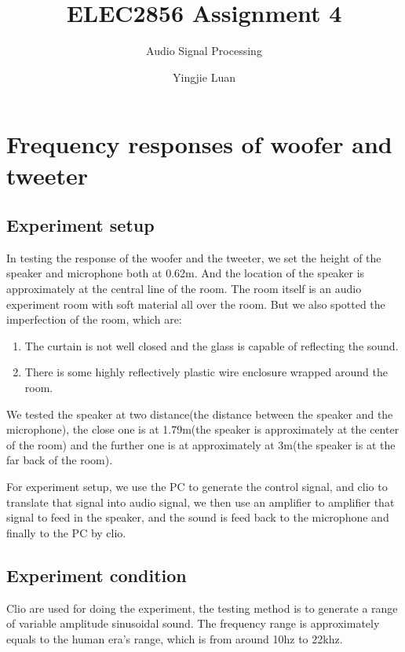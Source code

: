 \documentclass[11pt]{scrartcl}
\begin{document}
\title{ELEC2856 Assignment 4}
\subtitle{ Audio Signal Processing}
\author{Yingjie Luan}
\maketitle

\tableofcontents


\section{Frequency responses of woofer and tweeter }
\subsection{Experiment setup}

In testing the response of the woofer and the tweeter, we set the height of the speaker and microphone both at 0.62m. And the location of the speaker is approximately at the central line of the room. The room itself is an audio experiment room with soft material all over the room. But we also spotted the imperfection of the room, which are:
\begin{enumerate}
  \item The curtain is not well closed and the glass is capable of reflecting the sound.
  \item There is some highly reflectively plastic wire enclosure wrapped around the room.   
\end{enumerate}

We tested the speaker at two distance(the distance between the speaker and the microphone), the close one is at 1.79m(the speaker is approximately at the center of the room) and the further one is at approximately at 3m(the speaker is at the far back of the room).

For experiment setup, we use the PC to generate the control signal, and clio to translate that signal into audio signal, we then use an amplifier to amplifier that signal to feed in the speaker, and the sound is feed back to the microphone and finally to the PC by clio.

\subsection{Experiment condition}

Clio are used for doing the experiment, the testing method is to generate a range of variable amplitude sinusoidal sound. The frequency range is approximately equals to the human era's range, which is from around 10hz to 22khz. \\
\end{document}
